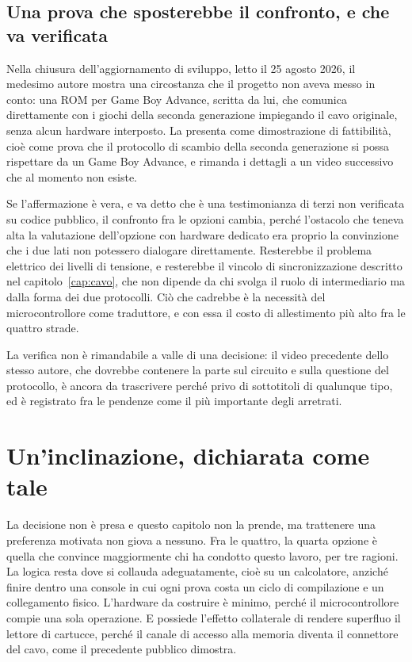 \subsection{Una prova che sposterebbe il confronto, e che va verificata}

Nella chiusura dell'aggiornamento di sviluppo, letto il 25 agosto 2026, il medesimo autore mostra una circostanza che il progetto non aveva messo in conto: una ROM per Game Boy Advance, scritta da lui, che comunica direttamente con i giochi della seconda generazione impiegando il cavo originale, senza alcun hardware interposto. La presenta come dimostrazione di fattibilità, cioè come prova che il protocollo di scambio della seconda generazione si possa rispettare da un Game Boy Advance, e rimanda i dettagli a un video successivo che al momento non esiste.

\begin{daverificare}
Se l'affermazione è vera, e va detto che è una testimonianza di terzi non verificata su codice pubblico, il confronto fra le opzioni cambia, perché l'ostacolo che teneva alta la valutazione dell'opzione con hardware dedicato era proprio la convinzione che i due lati non potessero dialogare direttamente. Resterebbe il problema elettrico dei livelli di tensione, e resterebbe il vincolo di sincronizzazione descritto nel capitolo~\ref{cap:cavo}, che non dipende da chi svolga il ruolo di intermediario ma dalla forma dei due protocolli. Ciò che cadrebbe è la necessità del microcontrollore come traduttore, e con essa il costo di allestimento più alto fra le quattro strade.
\end{daverificare}

La verifica non è rimandabile a valle di una decisione: il video precedente dello stesso autore, che dovrebbe contenere la parte sul circuito e sulla questione del protocollo, è ancora da trascrivere perché privo di sottotitoli di qualunque tipo, ed è registrato fra le pendenze come il più importante degli arretrati.

\section{Un'inclinazione, dichiarata come tale}

La decisione non è presa e questo capitolo non la prende, ma trattenere una preferenza motivata non giova a nessuno. Fra le quattro, la quarta opzione è quella che convince maggiormente chi ha condotto questo lavoro, per tre ragioni. La logica resta dove si collauda adeguatamente, cioè su un calcolatore, anziché finire dentro una console in cui ogni prova costa un ciclo di compilazione e un collegamento fisico. L'hardware da costruire è minimo, perché il microcontrollore compie una sola operazione. E possiede l'effetto collaterale di rendere superfluo il lettore di cartucce, perché il canale di accesso alla memoria diventa il connettore del cavo, come il precedente pubblico dimostra.

